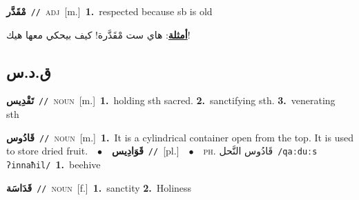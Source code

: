 \documentclass[10pt,a4paper,twoside]{article} %
\begin{document}
\begin{multicols}{2}
{\setlength\topsep{0pt}\textbf{\foreignlanguage{arabic}{مْقَدَّر}}\ {\color{gray}\texttt{//}\color{black}}\ \textsc{adj}\ [m.]\ \textbf{1.}~respected because sb is old\  \begin{flushright}\color{gray}\foreignlanguage{arabic}{\textbf{\underline{\foreignlanguage{arabic}{أمثلة}}}: هاي ست مْقَدَّرة! كيف بيحكي معها هيك!}\end{flushright}\color{black}} \vspace{2mm}

\vspace{-3mm}
\subsection*{\color{blue}\foreignlanguage{arabic}{ق.د.س}\color{blue}{}} 

{\setlength\topsep{0pt}\textbf{\foreignlanguage{arabic}{تَقْدِيس}}\ {\color{gray}\texttt{//}\color{black}}\ \textsc{noun}\ [m.]\ \textbf{1.}~holding sth sacred.  \textbf{2.}~sanctifying sth.  \textbf{3.}~venerating sth\ } \vspace{2mm}

{\setlength\topsep{0pt}\textbf{\foreignlanguage{arabic}{قَادُوس}}\ {\color{gray}\texttt{//}\color{black}}\ \textsc{noun}\ [m.]\ \textbf{1.}~It is a cylindrical container open from the top. It is used to store dried fruit.\ \ $\bullet$\ \ \setlength\topsep{0pt}\textbf{\foreignlanguage{arabic}{قَوَادِيس}}\ {\color{gray}\texttt{//}\color{black}}\ [pl.]\ \ $\bullet$\ \ \textsc{ph.} \color{gray} \foreignlanguage{arabic}{قَادُوس النَّحل}\color{black}\ {\color{gray}\texttt{/{\sffamily qaːduːs ʔinnaħil}/}\color{black}}\ \textbf{1.}~beehive\ } \vspace{2mm}

{\setlength\topsep{0pt}\textbf{\foreignlanguage{arabic}{قَدَاسَة}}\ {\color{gray}\texttt{//}\color{black}}\ \textsc{noun}\ [f.]\ \textbf{1.}~sanctity  \textbf{2.}~Holiness\ } \vspace{2mm}


\end{multicols}
\end{document}
